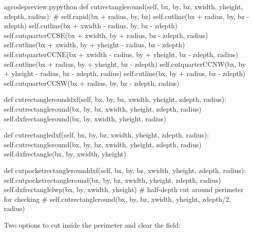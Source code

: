 \documentclass{ltxdoc}
\begin{document}
\lstset{firstnumber=\thegcpy}
\begin{writecode}{a}{gcodepreview.py}{python}
    def cutrectangleround(self, bx, by, bz, xwidth, yheight, zdepth, radius):
#        self.rapid(bx + radius, by, bz)
        self.cutline(bx + radius, by, bz - zdepth)
        self.cutline(bx + xwidth - radius, by, bz - zdepth)
        self.cutquarterCCSE(bx + xwidth, by + radius, bz - zdepth, radius) 
        self.cutline(bx + xwidth, by + yheight - radius, bz - zdepth)
        self.cutquarterCCNE(bx + xwidth - radius, by + yheight, bz - zdepth, radius) 
        self.cutline(bx + radius, by + yheight, bz - zdepth)
        self.cutquarterCCNW(bx, by + yheight - radius, bz - zdepth, radius) 
        self.cutline(bx, by + radius, bz - zdepth)
        self.cutquarterCCSW(bx + radius, by, bz - zdepth, radius) 

    def cutrectanglerounddxf(self, bx, by, bz, xwidth, yheight, zdepth, radius):
        self.cutrectangleround(bx, by, bz, xwidth, yheight, zdepth, radius)
        self.dxfrectangleround(bx, by, xwidth, yheight, radius)

    def cutrectangledxf(self, bx, by, bz, xwidth, yheight, zdepth, radius):
        self.cutrectangleround(bx, by, bz, xwidth, yheight, zdepth, radius)
        self.dxfrectangle(bx, by, xwidth, yheight)

    def cutpocketrectanglerounddxf(self, bx, by, bz, xwidth, yheight, zdepth, radius):
        self.cutpocketrectangleround(bx, by, bz, xwidth, yheight, zdepth, radius)
        self.dxfrectanglelwp(bx, by, xwidth, yheight)
    # half-depth cut around perimeter for checking
    #    self.cutrectangleround(bx, by, bz, xwidth, yheight, zdepth/2, radius)

\end{writecode}
\addtocounter{gcpy}{26}

Two options to cut inside the perimeter and clear the field:
\end{document}
